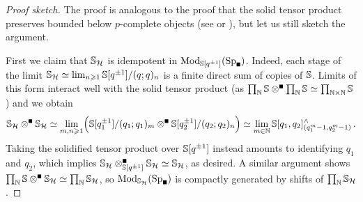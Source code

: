 \documentclass[DIV=12,numbers=enddot,leqno,bibliography=totoc]{scrartcl}
\begin{document}
	\begin{proof}[Proof sketch]
		The proof is analogous to the proof that the solid tensor product preserves bounded below $p$-complete objects (see \cite[Lecture~\href{https://youtu.be/KKzt6C9ggWA?list=PLx5f8IelFRgGmu6gmL-Kf_Rl_6Mm7juZO&t=3288}{6}]{AnalyticStacks} or \cite[Proposition~]{BoscoRationalHodge}), but let us still sketch the argument.
		
		First we claim that $\mathbb{S}_{\mathcal{H}}$ is idempotent in $\Mod_{\IS[q^{\pm 1}]}(\Sp_\solid)$. Indeed, each stage of the limit $\mathbb{S}_{\mathcal{H}}\simeq \operatorname*{lim}_{n\geqslant 1}\mathbb{S}[q^{\pm 1}]/(q;q)_n$ is a finite direct sum of copies of $\mathbb{S}$. Limits of this form interact well with the solid tensor product (as $\prod_\IN\IS\soltimes\prod_\IN\IS\simeq\prod_{\IN\times\IN}\IS$) and we obtain
		\begin{equation*}
			\IS_\Hh\soltimes\IS_\Hh\simeq \limit_{m,n\geqslant 1}\Bigl(\IS[q_1^{\pm 1}]/(q_1;q_1)_m\soltimes \IS[q_2^{\pm 1}]/(q_2;q_2)_n\Bigr)\simeq \limit_{m\in\IN}\IS[q_1,q_2]_{(q_1^m-1,q_2^m-1)}^\complete\,.
		\end{equation*}
		Taking the solidified tensor product over $\mathbb{S}[q^{\pm 1}]$ instead amounts to identifying $q_1$ and $q_2$, which implies $\IS_\Hh\soltimes_{\IS[q^{\pm 1}]}\IS_\Hh\simeq \IS_\Hh$, as desired. A similar argument shows $\prod_\IN\IS\soltimes\IS_\Hh\simeq \prod_\IN\IS_\Hh$, so $\Mod_{\IS_\Hh}(\Sp_\solid)$ is compactly generated by shifts of $\prod_{\mathbb{N}}\mathbb{S}_{\mathcal{H}}$.
		

\end{proof}
\end{document}
